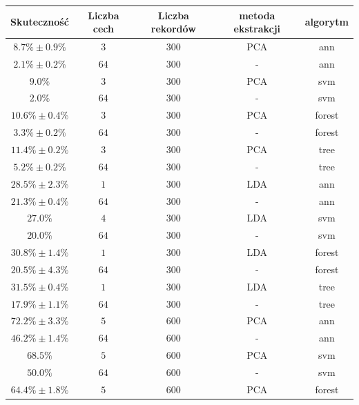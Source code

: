 \begin{table}
\centering
\begin{tabular}{|c|c|c|c|c|}
\hline
Skuteczność & Liczba cech & Liczba rekordów & metoda ekstrakcji & algorytm \\
\hline
\rowcolor{Gray}
$8.7 \% \pm 0.9 \%$ & $3$ & $ 300 $ & PCA & ann \\
\hline
\rowcolor{Gray}
$2.1 \% \pm 0.2 \%$ & $64$ & $ 300 $ & - & ann \\
\hline
\rowcolor{White}
$9.0 \% $ & $3$ & $ 300 $ & PCA & svm \\
\hline
\rowcolor{White}
$2.0 \% $ & $64$ & $ 300 $ & - & svm \\
\hline
\rowcolor{Gray}
$10.6 \% \pm 0.4 \%$ & $3$ & $ 300 $ & PCA & forest \\
\hline
\rowcolor{Gray}
$3.3 \% \pm 0.2 \%$ & $64$ & $ 300 $ & - & forest \\
\hline
\rowcolor{White}
$11.4 \% \pm 0.2 \%$ & $3$ & $ 300 $ & PCA & tree \\
\hline
\rowcolor{White}
$5.2 \% \pm 0.2 \%$ & $64$ & $ 300 $ & - & tree \\
\hline
\rowcolor{Gray}
$28.5 \% \pm 2.3 \%$ & $1$ & $ 300 $ & LDA & ann \\
\hline
\rowcolor{Gray}
$21.3 \% \pm 0.4 \%$ & $64$ & $ 300 $ & - & ann \\
\hline
\rowcolor{White}
$27.0 \% $ & $4$ & $ 300 $ & LDA & svm \\
\hline
\rowcolor{White}
$20.0 \% $ & $64$ & $ 300 $ & - & svm \\
\hline
\rowcolor{Gray}
$30.8 \% \pm 1.4 \%$ & $1$ & $ 300 $ & LDA & forest \\
\hline
\rowcolor{Gray}
$20.5 \% \pm 4.3 \%$ & $64$ & $ 300 $ & - & forest \\
\hline
\rowcolor{White}
$31.5 \% \pm 0.4 \%$ & $1$ & $ 300 $ & LDA & tree \\
\hline
\rowcolor{White}
$17.9 \% \pm 1.1 \%$ & $64$ & $ 300 $ & - & tree \\
\hline
\rowcolor{Gray}
$72.2 \% \pm 3.3 \%$ & $5$ & $ 600 $ & PCA & ann \\
\hline
\rowcolor{Gray}
$46.2 \% \pm 1.4 \%$ & $64$ & $ 600 $ & - & ann \\
\hline
\rowcolor{White}
$68.5 \%$ & $5$ & $ 600 $ & PCA & svm \\
\hline
\rowcolor{White}
$50.0\%$ & $64$ & $ 600 $ & - & svm \\
\hline
\rowcolor{Gray}
$64.4 \%\pm 1.8\%$ & $5$ & $ 600 $ & PCA & forest \\

\end{tabular}
\end{table}
